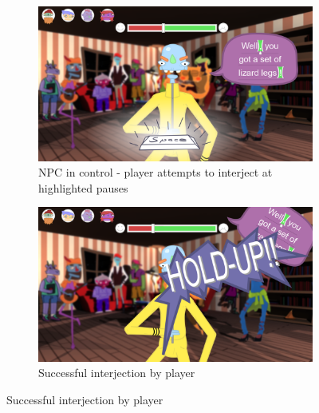 \begin{figure}[H]
  \centering\begin{subfigure}{.44\textwidth}
    \centering
    \includegraphics[width=.9\linewidth]{images/UI_yelling_defense}
    \caption{NPC in control - player attempts to interject at highlighted pauses}
    \label{fig:yelling_contest_a}
  \end{subfigure}%
  \begin{subfigure}{.44\textwidth}
    \centering
    \includegraphics[width=.9\linewidth]{images/UI_yelling_interrupt}
    \caption{Successful interjection by player}
    \label{fig:yelling_contest_b}
  \end{subfigure}
  

\end{figure}
